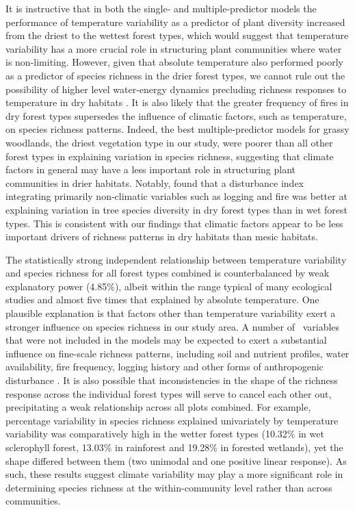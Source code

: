 It is instructive that in both the single- and multiple-predictor models the performance of temperature variability as a predictor of plant diversity increased from the driest to the wettest forest types, which would suggest that temperature variability has a more crucial role in structuring plant communities where water is non-limiting. However, given that absolute temperature also performed poorly as a predictor of species richness in the drier forest types, we cannot rule out the possibility of higher level water-energy dynamics precluding richness responses to temperature in dry habitats \citep{Francis2003}. It is also likely that the greater frequency of fires in dry forest types \citep{CLARKE2005} supersedes the influence of climatic factors, such as temperature, on species richness patterns. Indeed, the best multiple-predictor models for grassy woodlands, the driest vegetation type in our study, were poorer than all other forest types in explaining variation in species richness, suggesting that climate factors in general may have a less important role in structuring plant communities in drier habitats. Notably, \citet{Bongers2009} found that a disturbance index integrating primarily non-climatic variables such as logging and fire was better at explaining variation in tree species diversity in dry forest types than in wet forest types. This is consistent with our findings that climatic factors appear to be less important drivers of richness patterns in dry habitats than mesic habitats. 


The statistically strong independent relationship between temperature variability and species richness for all forest types combined is counterbalanced by weak explanatory power (4.85\%), albeit within the range typical of many ecological studies \citep{Jennions2002} and almost five times that explained by absolute temperature. One plausible explanation is that factors other than temperature variability exert a stronger influence on species richness in our study area. A number of \ variables that were not included in the models may be expected to exert a substantial influence on fine-scale richness patterns, including soil and nutrient profiles, water availability, fire frequency, logging history and other forms of anthropogenic disturbance \citep{Pausas2001}. It is also possible that inconsistencies in the shape of the richness response across the individual forest types will serve to cancel each other out, precipitating a weak relationship across all plots combined. For example, percentage variability in species richness explained univariately by temperature variability was comparatively high in the wetter forest types (10.32\% in wet sclerophyll forest, 13.03\% in rainforest and 19.28\% in forested wetlands), yet the shape differed between them (two unimodal and one positive linear response). As such, these results suggest climate variability may play a more significant role in determining species richness at the within-community level rather than across communities.

